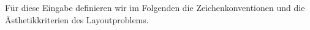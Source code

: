 Für diese Eingabe definieren wir im Folgenden die Zeichenkonventionen und die Ästhetikkriterien des Layoutproblems.



